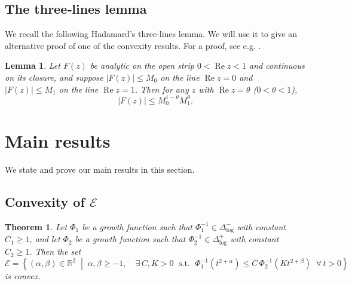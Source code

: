 \documentclass[12pt]{amsart}
\newtheorem{theorem}{Theorem}
\newtheorem{lemma}{Lemma}
\newcommand{\R}{\mathbb{R}}
\begin{document}
\subsection{The three‑lines lemma}
We recall the following Hadamard's three‑lines lemma. We will use it to give an alternative proof of one of the convexity results. For a proof, see e.g. \cite[Chapter I, Theorem 5.1]{Garnett}.
\begin{lemma}\label{lem:threelines}
Let $F(z)$ be analytic on the open strip $0 < \operatorname{Re} z < 1$ and continuous on its closure, and suppose $|F(z)| \le M_0$ on the line $\operatorname{Re} z = 0$ and $|F(z)| \le M_1$ on the line $\operatorname{Re} z = 1$. Then for any $z$ with $\operatorname{Re} z = \theta$ ($0<\theta<1$),
\[
|F(z)| \le M_0^{1-\theta} M_1^{\theta}.
\]
\end{lemma}

\section{Main results}
We state and prove our main results in this section.

\subsection{Convexity of $\mathcal{E}$} 

\begin{theorem}\label{thm:convexity}
Let $\Phi_1$ be a growth function such that $\Phi_1^{-1}\in \Delta_{\log}^-$ with constant $C_1\geq 1$, and let $\Phi_2$ be a growth function such that $\Phi_2^{-1}\in \Delta_{\log}^+$ with constant
$C_2 \ge 1$. Then
the set
\[
\mathcal{E} = \left\{ (\alpha,\beta) \in \R^2 \;\middle|\;
\alpha, \beta \ge -1, \quad
\exists\, C,K > 0 \;\text{ s.t. }\;
\Phi_1^{-1}(t^{2+\alpha}) \le C\,\Phi_2^{-1}(Kt^{2+\beta})
\;\; \forall\, t > 0
\right\}
\]
is convex.
\end{theorem}
\end{document}

